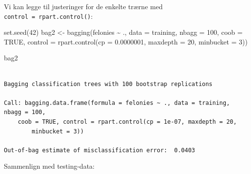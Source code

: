 \documentclass[
  letterpaper,
  DIV=11,
  numbers=noendperiod]{scrreprt}
\newenvironment{Shaded}{\begin{snugshade}}{\end{snugshade}}
\newcommand{\AttributeTok}[1]{\textcolor[rgb]{0.40,0.45,0.13}{#1}}
\newcommand{\ConstantTok}[1]{\textcolor[rgb]{0.56,0.35,0.01}{#1}}
\newcommand{\DecValTok}[1]{\textcolor[rgb]{0.68,0.00,0.00}{#1}}
\newcommand{\FloatTok}[1]{\textcolor[rgb]{0.68,0.00,0.00}{#1}}
\newcommand{\FunctionTok}[1]{\textcolor[rgb]{0.28,0.35,0.67}{#1}}
\newcommand{\NormalTok}[1]{\textcolor[rgb]{0.00,0.23,0.31}{#1}}
\newcommand{\OtherTok}[1]{\textcolor[rgb]{0.00,0.23,0.31}{#1}}
\newcommand{\SpecialCharTok}[1]{\textcolor[rgb]{0.37,0.37,0.37}{#1}}
\newcommand{\StringTok}[1]{\textcolor[rgb]{0.13,0.47,0.30}{#1}}
\begin{document}
Vi kan legge til justeringer for de enkelte trærne med
\texttt{control\ =\ rpart.control()}:

\begin{Shaded}
\begin{Highlighting}[]
\FunctionTok{set.seed}\NormalTok{(}\DecValTok{42}\NormalTok{)}
\NormalTok{bag2 }\OtherTok{\textless{}{-}} \FunctionTok{bagging}\NormalTok{(felonies }\SpecialCharTok{\textasciitilde{}}\NormalTok{ ., }\AttributeTok{data =}\NormalTok{ training,}
                \AttributeTok{nbagg =} \DecValTok{100}\NormalTok{, }\AttributeTok{coob =} \ConstantTok{TRUE}\NormalTok{,}
                \AttributeTok{control =} \FunctionTok{rpart.control}\NormalTok{(}\AttributeTok{cp =} \FloatTok{0.0000001}\NormalTok{, }\AttributeTok{maxdepth =} \DecValTok{20}\NormalTok{, }\AttributeTok{minbucket =} \DecValTok{3}\NormalTok{))}

\NormalTok{bag2}
\end{Highlighting}
\end{Shaded}

\begin{verbatim}

Bagging classification trees with 100 bootstrap replications 

Call: bagging.data.frame(formula = felonies ~ ., data = training, nbagg = 100, 
    coob = TRUE, control = rpart.control(cp = 1e-07, maxdepth = 20, 
        minbucket = 3))

Out-of-bag estimate of misclassification error:  0.0403 
\end{verbatim}

Sammenlign med testing-data:

\begin{Shaded}
\end{Shaded}
\end{document}
